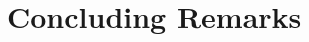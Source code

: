 \begin{table}[]
\begin{tabular}{|c|c|c|c|c|}
\end{tabular}
\caption{\footnotesize{}
\label{tab:LLvsLLMapping}}
\end{table}






\section{Concluding Remarks}


 

































